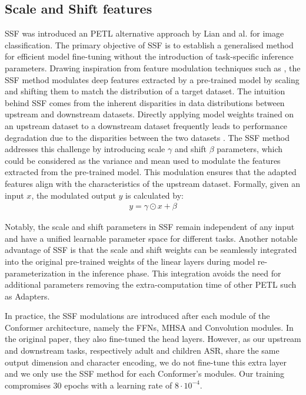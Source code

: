 \subsection{Scale and Shift features}
\ac{SSF} was introduced an \ac{PETL} alternative approach by Lian and al. \cite{lian2022scaling} for image classification. The primary objective of \ac{SSF} is to establish a generalised method for efficient model fine-tuning without the introduction of task-specific inference parameters. Drawing inspiration from feature modulation techniques such as \cite{wu2018group,huang2017arbitrary}, the \ac{SSF} method modulates deep features extracted by a pre-trained model by scaling and shifting them to match the distribution of a target dataset. 
The intuition behind \ac{SSF} comes from the inherent disparities in data distributions between upstream and downstream datasets. Directly applying model weights trained on an upstream dataset to a downstream dataset frequently leads to performance degradation due to the disparities between the two datasets \cite{sun2016return}. The \ac{SSF} method addresses this challenge by introducing scale $\gamma$ and shift $\beta$ parameters, which could be considered as the variance and mean used to modulate the features extracted from the pre-trained model. This modulation ensures that the adapted features align with the characteristics of the upstream dataset. Formally, given an input $x$, the modulated output $y$ is calculated by:
\begin{align}
    y = \gamma \odot x + \beta
\end{align}

Notably, the scale and shift parameters in \ac{SSF} remain independent of any input and have a unified learnable parameter space for different tasks. Another notable advantage of \ac{SSF} is that the scale and shift weights can be seamlessly integrated into the original pre-trained weights of the linear layers during model re-parameterization in the inference phase. This integration avoids the need for additional parameters removing the extra-computation time of other \ac{PETL} such as Adapters.

In practice, the \ac{SSF} modulations are introduced after each module of the Conformer architecture, namely the \acp{FFN}, \ac{MHSA} and Convolution modules. In the original paper, they also fine-tuned the head layers. However, as our upstream and downstream tasks, respectively adult and children \ac{ASR}, share the same output dimension and character encoding, we do not fine-tune this extra layer and we only use the \ac{SSF} method for each Conformer's modules. Our training compromises 30 epochs with a learning rate of $8\cdot10^{-4}$.

